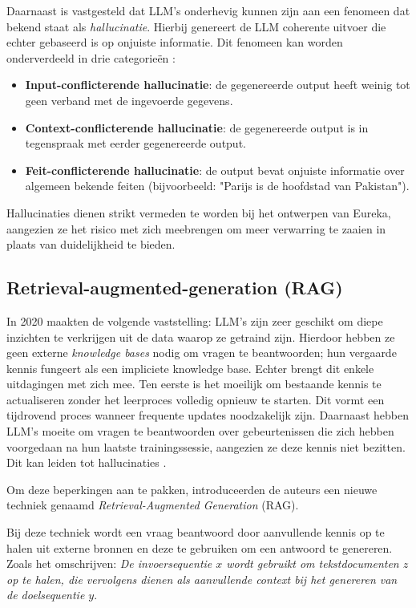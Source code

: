 Daarnaast is vastgesteld dat LLM's onderhevig kunnen zijn aan een fenomeen dat bekend staat als \textit{hallucinatie}. Hierbij genereert de LLM coherente uitvoer die echter gebaseerd is op onjuiste informatie. Dit fenomeen kan worden onderverdeeld in drie categorieën \autocite{Naveed2023}:

\begin{itemize} 
  \item \textbf{Input-conflicterende hallucinatie}: de gegenereerde output heeft weinig tot geen verband met de ingevoerde gegevens. 
  \item \textbf{Context-conflicterende hallucinatie}: de gegenereerde output is in tegenspraak met eerder gegenereerde output. 
  \item \textbf{Feit-conflicterende hallucinatie}: de output bevat onjuiste informatie over algemeen bekende feiten (bijvoorbeeld: "Parijs is de hoofdstad van Pakistan"). 
\end{itemize}

Hallucinaties dienen strikt vermeden te worden bij het ontwerpen van Eureka, aangezien ze het risico met zich meebrengen om meer verwarring te zaaien in plaats van duidelijkheid te bieden.

\subsection{Retrieval-augmented-generation (RAG)}
\label{sec:RAG}

In 2020 maakten \textcite{Lewis2020} de volgende vaststelling: LLM's zijn zeer geschikt om diepe inzichten te verkrijgen uit de data waarop ze getraind zijn. Hierdoor hebben ze geen externe \textit{knowledge bases} nodig om vragen te beantwoorden; hun vergaarde kennis fungeert als een impliciete knowledge base. Echter brengt dit enkele uitdagingen met zich mee. Ten eerste is het moeilijk om bestaande kennis te actualiseren zonder het leerproces volledig opnieuw te starten. Dit vormt een tijdrovend proces wanneer frequente updates noodzakelijk zijn. Daarnaast hebben LLM's moeite om vragen te beantwoorden over gebeurtenissen die zich hebben voorgedaan na hun laatste trainingssessie, aangezien ze deze kennis niet bezitten. Dit kan leiden tot hallucinaties \autocite{Gao2023}.

Om deze beperkingen aan te pakken, introduceerden de auteurs een nieuwe techniek genaamd \textit{Retrieval-Augmented Generation} (RAG).

Bij deze techniek wordt een vraag beantwoord door aanvullende kennis op te halen uit externe bronnen en deze te gebruiken om een antwoord te genereren. Zoals \textcite{Lewis2020} het omschrijven: \textit{De invoersequentie $x$ wordt gebruikt om tekstdocumenten $z$ op te halen, die vervolgens dienen als aanvullende context bij het genereren van de doelsequentie $y$}.

